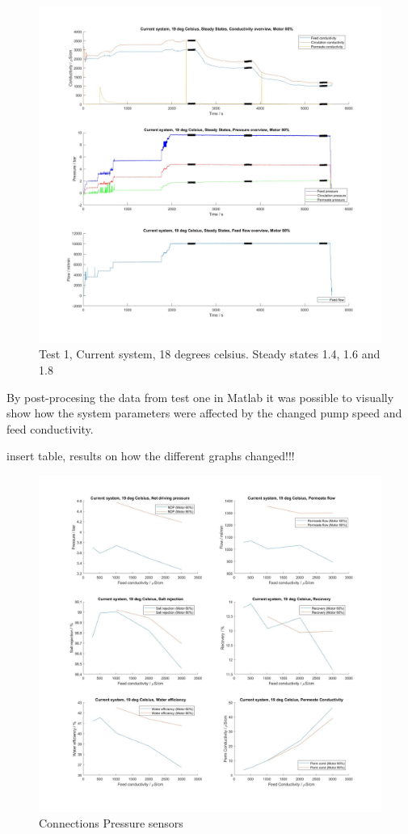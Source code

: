 \begin{figure}[H]
    \centering
    \includegraphics[width=1.1\textwidth]{overview20_80}
    \caption{Test 1, Current system, 18 degrees celsius. Steady states 1.4, 1.6 and 1.8}
    \label{fig:PressConn}
\end{figure}

\newpage

By post-procesing the data from test one in Matlab it was possible to visually show how the system parameters were affected by the changed pump speed and feed conductivity. 


insert table, results on how the different graphs changed!!!

\begin{figure}[H]
    \centering
    \includegraphics[width=1.1\textwidth]{Key20}
    \caption{Connections Pressure sensors}
    \label{fig:PressConn}
\end{figure}

